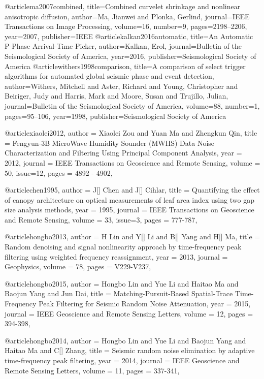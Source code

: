 @article{ma2007combined,
  title={Combined curvelet shrinkage and nonlinear anisotropic diffusion},
  author={Ma, Jianwei and Plonka, Gerlind},
  journal={IEEE Transactions on Image Processing},
  volume={16},
  number={9},
  pages={2198--2206},
  year={2007},
  publisher={IEEE}
}
@article{kalkan2016automatic,
  title={An Automatic P-Phase Arrival-Time Picker},
  author={Kalkan, Erol},
  journal={Bulletin of the Seismological Society of America},
  year={2016},
  publisher={Seismological Society of America}
}
@article{withers1998comparison,
  title={A comparison of select trigger algorithms for automated global seismic phase and event detection},
  author={Withers, Mitchell and Aster, Richard and Young, Christopher and Beiriger, Judy and Harris, Mark and Moore, Susan and Trujillo, Julian},
  journal={Bulletin of the Seismological Society of America},
  volume={88},
  number={1},
  pages={95--106},
  year={1998},
  publisher={Seismological Society of America}
}



@article{xiaolei2012,
  author =	 {Xiaolei Zou and Yuan Ma and Zhengkun Qin},
  title =	 {Fengyun-3B MicroWave Humidity Sounder (MWHS) Data Noise Characterization and Filtering Using Principal Component Analysis},
  year =	 2012,
  journal =	 {IEEE Transactions on Geoscience and Remote Sensing},
  volume =	 50,
  issue=12,
  pages =	 {4892 - 4902},
}

@article{chen1995,
  author =	 {J[] Chen and J[] Cihlar},
  title =	 {Quantifying the effect of canopy architecture on optical measurements of leaf area index using two gap size analysis methods},
  year =	 1995,
  journal =	 {IEEE Transactions on Geoscience and Remote Sensing},
  volume =	 33,
  issue=3,
  pages =	 {777-787},
}


@article{hongbo2013,
  author =	 {H Lin and Y[] Li and B[] Yang and H[] Ma},
  title =	 {Random denoising and signal nonlinearity approach by time-frequency peak filtering using weighted frequency reassignment},
  year =	 2013,
  journal =	 {Geophysics},
  volume =	 78,
  pages =	 {V229-V237},
}

@article{hongbo2015,
  author =	 {Hongbo Lin and Yue Li and Haitao Ma and Baojun Yang and Jun Dai},
  title =	 {Matching-Pursuit-Based Spatial-Trace Time-Frequency Peak Filtering for Seismic Random Noise Attenuation},
  year =	 2015,
  journal =	 {IEEE Geoscience and Remote Sensing Letters},
  volume =	 12,
  pages =	 {394-398},
}

@article{hongbo2014,
  author =	 {Hongbo Lin and Yue Li and Baojun Yang and Haitao Ma and C[] Zhang},
  title =	 { Seismic random noise elimination by adaptive time-frequency peak filtering},
  year =	 2014,
  journal =	 {IEEE Geoscience and Remote Sensing Letters},
  volume =	 11,
  pages =	 {337-341},
}

